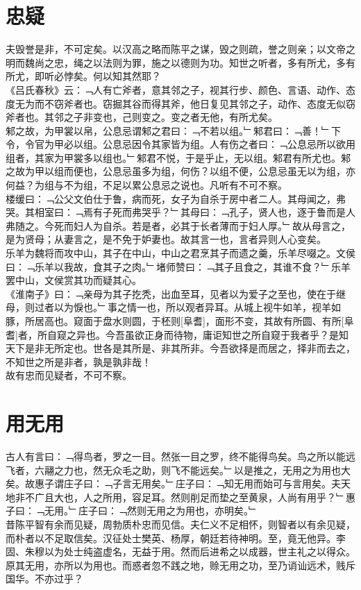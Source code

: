 \chapter{忠疑}%
夫毁誉是非，不可定矣。以汉高之略而陈平之谋，毁之则疏，誉之则亲；以文帝之明而魏尚之忠，绳之以法则为罪，施之以德则为功。知世之听者，多有所尤，多有所尤，即听必悖矣。何以知其然耶？\\
《吕氏春秋》云：﹁人有亡斧者，意其邻之子，视其行步、颜色、言语、动作、态度无为而不窃斧者也。窃掘其谷而得其斧，他日复见其邻之子，动作、态度无似窃斧者也。其邻之子非变也，己则变之。变之者无他，有所尤矣。\\
邾之故，为甲裳以帛，公息忌谓邾之君曰：﹁不若以组。﹂邾君曰：﹁善！﹂下令，令官为甲必以组。公息忌因令其家皆为组。人有伤之者曰：﹁公息忌所以欲用组者，其家为甲裳多以组也。﹂邾君不悦，于是乎止，无以组。邾君有所尤也。邾之故为甲以组而便也，公息忌虽多为组，何伤？以组不便，公息忌虽无以为组，亦何益？为组与不为组，不足以累公息忌之说也。凡听有不可不察。\\
楼缓曰：﹁公父文伯仕于鲁，病而死，女子为自杀于房中者二人。其母闻之，弗哭。其相室曰：﹁焉有子死而弗哭乎？﹂其母曰：﹁孔子，贤人也，逐于鲁而是人弗随之。今死而妇人为自杀。若是者，必其于长者薄而于妇人厚。﹂故从母言之，是为贤母；从妻言之，是不免于妒妻也。故其言一也，言者异则人心变矣。\\
乐羊为魏将而攻中山，其子在中山，中山之君烹其子而遗之羹，乐羊尽啜之。文侯曰：﹁乐羊以我故，食其子之肉。﹂堵师赞曰：﹁其子且食之，其谁不食？﹂乐羊罢中山，文侯赏其功而疑其心。\\
《淮南子》曰：﹁亲母为其子扢秃，出血至耳，见者以为爱子之至也，使在于继母，则过者以为悷也。﹂事之情一也，所以观者异耳。从城上视牛如羊，视羊如豚，所居高也。窥面于盘水则圆，于柸则[阜耆]，面形不变，其故有所圆、有所[阜耆]者，所自窥之异也。今吾虽欲正身而待物，庸讵知世之所自窥于我者乎？是知天下是非无所定也。世各是其所是、非其所非。今吾欲择是而居之，择非而去之，不知世之所是非者，孰是孰非哉！
\\
故有忠而见疑者，不可不察。
%
%
\chapter{用无用 }%
古人有言曰：﹁得鸟者，罗之一目。然张一目之罗，终不能得鸟矣。鸟之所以能远飞者，六翮之力也，然无众毛之助，则飞不能远矣。﹂以是推之，无用之为用也大矣。故惠子谓庄子曰：﹁子言无用矣。﹂庄子曰：﹁知无用而始可与言用矣。夫天地非不广且大也，人之所用，容足耳。然则削足而垫之至黄泉，人尚有用乎？﹂惠子曰：﹁无用。﹂庄子曰：﹁然则无用之为用也，亦明矣。﹂\\
昔陈平智有余而见疑，周勃质朴忠而见信。夫仁义不足相怀，则智者以有余见疑，而朴者以不足取信矣。汉征处士樊英、杨厚，朝廷若待神明。至，竟无他异。李固、朱穆以为处士纯盗虚名，无益于用。然而后进希之以成器，世主礼之以得众。\\
原其无用，亦所以为用也。而惑者忽不践之地，赊无用之功，至乃诮讪远术，贱斥国华。不亦过乎？
%
%
